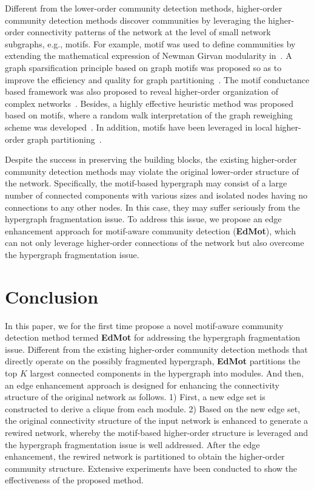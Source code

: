 \documentclass[sigconf]{acmart}
\begin{document}
Different from the lower-order community detection methods, higher-order community detection methods discover communities by leveraging the higher-order connectivity patterns of the network at the level of small network subgraphs, e.g., motifs.
For example, motif was used to define communities by extending the mathematical expression of Newman Girvan modularity in~\cite{arenas2008motif}. A graph sparsification principle based on graph motifs was proposed so as to improve the efficiency and quality for graph partitioning~\cite{zhao2015gsparsify}. The motif conductance based framework was also proposed to reveal higher-order organization of complex networks~\cite{benson2016higher}. Besides, a highly effective heuristic method was proposed based on motifs, where a random walk interpretation of the graph reweighing scheme was developed~\cite{tsourakakis2017scalable}. In addition, motifs have been leveraged in local higher-order graph partitioning~\cite{yin2017local}.

Despite the success in preserving the building blocks, the existing higher-order community detection methods may violate the original lower-order structure of the network. Specifically, the motif-based hypergraph may consist of a large number of connected components with various sizes and isolated nodes having no connections to any other nodes. In this case, they may suffer seriously from the hypergraph fragmentation issue. To address this issue, we propose an edge enhancement approach for motif-aware community detection (\textbf{EdMot}), which can not only leverage higher-order connections of the network but also overcome the hypergraph fragmentation issue.





\section{Conclusion}
\label{sec:conclusion}

In this paper, we for the first time propose a novel motif-aware community detection method termed \textbf{EdMot} for addressing the hypergraph fragmentation issue. Different from the existing higher-order community detection methods that directly operate on the possibly fragmented hypergraph, \textbf{EdMot} partitions the top $K$ largest connected components in the hypergraph into modules. And then, an edge enhancement approach is designed for enhancing the connectivity structure of the original network as follows. 1) First, a new edge set is constructed to derive a clique from each module. 2) Based on the new edge set, the original connectivity structure of the input network is enhanced to generate a rewired network, whereby the motif-based higher-order structure is leveraged and the hypergraph fragmentation issue is well addressed. After the edge enhancement, the rewired network is partitioned to obtain the higher-order community structure. Extensive experiments have been conducted to show the effectiveness of the proposed method.
\end{document}
